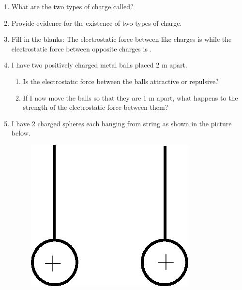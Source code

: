       
      \label{m38781*id202059}\begin{enumerate}[noitemsep, label=\textbf{\arabic*}. ] 
            \label{m38781*uid21}\item What are the two types of charge called?\newline
            
\label{m38781*uid22}\item Provide evidence for the existence of two types of charge.\newline
            
\label{m38781*uid23}\item Fill in the blanks: The electrostatic force between like charges is  \uline{\hspace{10ex}}
 while the electrostatic force between opposite charges is  \uline{\hspace{10ex}}
.\newline
            
\label{m38781*uid24}\item I have two positively charged metal balls placed 2 m apart.
\label{m38781*id202122}\begin{enumerate}[noitemsep, label=\textbf{\alph*}. ] 
            \label{m38781*uid25}\item Is the electrostatic force between the balls attractive or repulsive?
\label{m38781*uid26}\item If I now move the balls so that they are 1 m apart, what happens to the strength of the electrostatic force between them?
\end{enumerate}
        \newline
            \label{m38781*uid27}\item I have 2 charged spheres each hanging from string as shown in the picture below.

    \setcounter{subfigure}{0}


	\begin{figure}[H] %
    \begin{center}
    \label{m38781*id202166!!!underscore!!!media}\label{m38781*id202166!!!underscore!!!printimage}\includegraphics[width=0.3\columnwidth]{col11305.imgs/m38781_PG10C8_012.png} %
        

\end{center}
\end{figure}
\end{enumerate}
